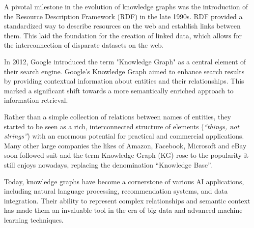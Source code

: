 A pivotal milestone in the evolution of knowledge graphs was the introduction of the Resource Description Framework (RDF) in the late 1990s. RDF provided a standardized way to describe resources on the web and establish links between them. This laid the foundation for the creation of linked data, which allows for the interconnection of disparate datasets on the web.

In 2012, Google introduced the term "Knowledge Graph" as a central element of their search engine. Google's Knowledge Graph aimed to enhance search results by providing contextual information about entities and their relationships. This marked a significant shift towards a more semantically enriched approach to information retrieval.

Rather than a simple collection of relations between names of entities, they started to be seen as a rich, interconnected structure of elements (\textit{``things, not strings''}) with an enormous potential for practical and commercial applications. Many other large companies the likes of Amazon, Facebook, Microsoft and eBay soon followed suit 
and the term Knowledge Graph (KG) rose to the popularity it still enjoys nowadays, replacing the denomination ``Knowledge Base''.

Today, knowledge graphs have become a cornerstone of various AI applications, including natural language processing, recommendation systems, and data integration. Their ability to represent complex relationships and semantic context has made them an invaluable tool in the era of big data and advanced machine learning techniques.



